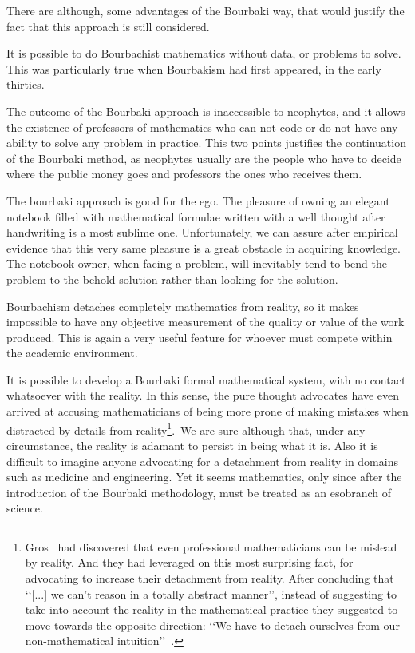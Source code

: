 \documentclass[]{scrartcl}
\theoremstyle{definition}
\begin{document}
There are although, some advantages of the Bourbaki way, that would justify the fact that this approach is still considered.

It is possible to do Bourbachist mathematics without data, or problems to solve. This was particularly true when Bourbakism had first appeared, in the early thirties.

The outcome of the Bourbaki approach is inaccessible to neophytes, and it allows the existence of professors of mathematics who can not code or do not have any ability to solve any problem in practice. This two points justifies the continuation of the Bourbaki method, as neophytes usually are the people who have to decide where the public money goes and professors the ones who receives them.

The bourbaki approach is good for the ego. The pleasure of owning an elegant notebook filled with mathematical formulae written with a well thought after handwriting is a most sublime one. Unfortunately, we can assure after empirical evidence that this very same pleasure is a great obstacle in acquiring knowledge. The notebook owner, when facing a problem, will inevitably tend to bend the problem to the behold solution rather than looking for the solution.


Bourbachism detaches completely mathematics from reality, so it makes impossible to have any objective measurement of the quality or value of the work produced. This is again a very useful feature for whoever must compete within the academic environment. 

It is possible to develop a Bourbaki formal mathematical system, with no contact whatsoever with the reality. In this sense, the pure thought advocates have even arrived at accusing mathematicians of being more prone of making mistakes when distracted by details from reality\footnote{
    Gros~\cite{gros2019masters} had discovered that even professional mathematicians can be mislead by reality. And they had leveraged on this most surprising fact, for advocating to increase their detachment from reality. After concluding that \lq\lq [...] we can't reason in a totally abstract manner\rq\rq, instead of suggesting to take into account the reality in the mathematical practice they suggested to move towards the opposite direction: \lq\lq We have to detach ourselves from our non-mathematical intuition\rq\rq~\cite{gros2019sciencedaily}.
}. We are sure although that, under any circumstance, the reality is adamant to persist in being what it is. Also it is difficult to imagine anyone advocating for a detachment from reality in domains such as medicine and engineering. Yet it seems mathematics, only since after the introduction of the Bourbaki methodology, must be treated as an esobranch of science.
\end{document}
